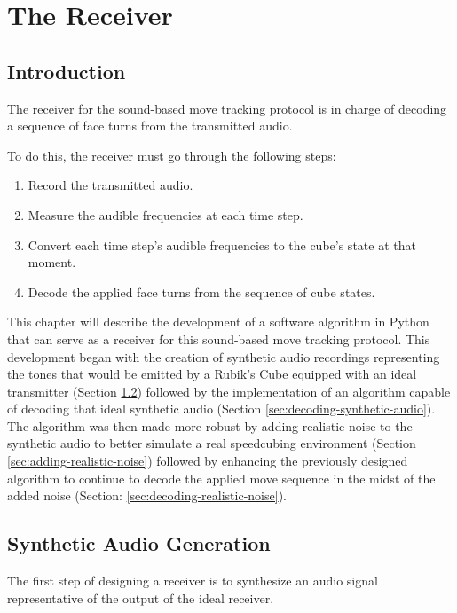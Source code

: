 
\chapter{The Receiver} %

\label{Chapter5}

\section{Introduction}
The receiver for the sound-based move tracking protocol is in charge of decoding a sequence of face turns from the transmitted audio.

To do this, the receiver must go through the following steps:
\begin{enumerate}
    \item Record the transmitted audio.
    \item Measure the audible frequencies at each time step.
    \item Convert each time step's audible frequencies to the cube's state at that moment.
    \item Decode the applied face turns from the sequence of cube states.
\end{enumerate}

This chapter will describe the development of a software algorithm in Python that can serve as a receiver for this sound-based move tracking protocol. 
This development began with the creation of synthetic audio recordings representing the tones that would be emitted by a Rubik's Cube equipped with an ideal transmitter (Section \ref{sec:synthetic-audio-generation}) followed by the implementation of an algorithm capable of decoding that ideal synthetic audio (Section \ref{sec:decoding-synthetic-audio}).
The algorithm was then made more robust by adding realistic noise to the synthetic audio to better simulate a real speedcubing environment (Section \ref{sec:adding-realistic-noise}) followed by enhancing the previously designed algorithm to continue to decode the applied move sequence in the midst of the added noise (Section: \ref{sec:decoding-realistic-noise}).


\section{Synthetic Audio Generation}
\label{sec:synthetic-audio-generation}
The first step of designing a receiver is to synthesize an audio signal representative of the output of the ideal receiver.

